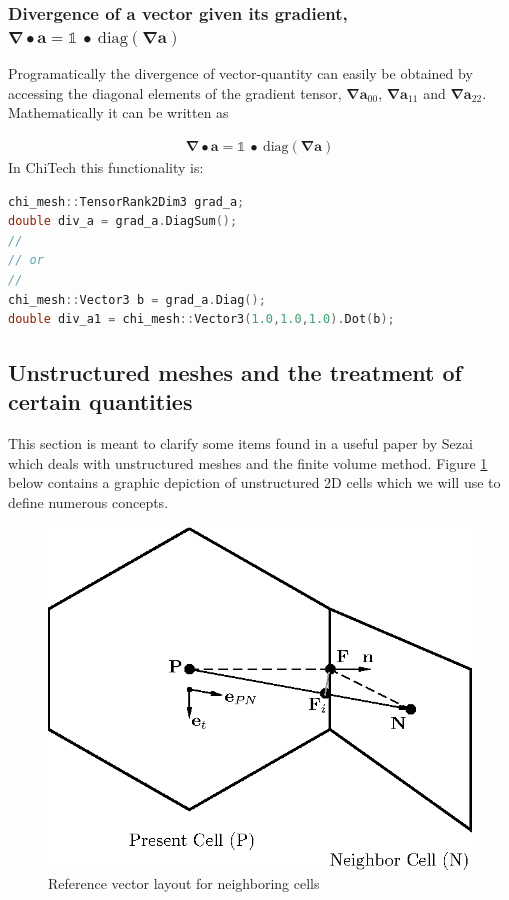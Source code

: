 \documentclass[11pt,letterpaper,titlepage]{article}
\newcommand{\beqn}{\begin{equation}
	\begin{aligned}}
\newcommand{\eeqn}{\end{aligned}
	\end{equation}}
\newcommand{\bnabla}{\boldsymbol{\nabla}}
\numberwithin{equation}{section}
\begin{document}
\subsubsection{Divergence of a vector given its gradient, $\bnabla \bullet \mathbf{a} = \mathbb{1} \ \bullet \ \text{diag}(\bnabla \mathbf{a})$}
Programatically the divergence of vector-quantity can easily be obtained by accessing the diagonal elements of the gradient tensor, $\bnabla \mathbf{a}_{00}$, $\bnabla \mathbf{a}_{11}$ and $\bnabla \mathbf{a}_{22}$. Mathematically it can be written as

\beqn 
\bnabla \bullet \mathbf{a} = \mathbb{1} \ \bullet \ \text{diag}(\bnabla \mathbf{a})
\eeqn 
\newline
\newline
In ChiTech this functionality is:
\begin{lstlisting}[language=c++]
chi_mesh::TensorRank2Dim3 grad_a;
double div_a = grad_a.DiagSum();
//
// or
//
chi_mesh::Vector3 b = grad_a.Diag();
double div_a1 = chi_mesh::Vector3(1.0,1.0,1.0).Dot(b);
\end{lstlisting}

\vspace{1cm}
\subsection{Unstructured meshes and the treatment of certain quantities}
This section is meant to clarify some items found in a useful paper by Sezai \cite{Sezai} which deals with unstructured meshes and the finite volume method. Figure \ref{fig:faceaverages} below contains a graphic depiction of unstructured 2D cells which we will use to define numerous concepts.

\begin{figure}[H]
\centering
\includegraphics[width=0.5\linewidth]{Figures/FaceAverages}
\caption{Reference vector layout for neighboring cells}
\label{fig:faceaverages}
\end{figure}
\end{document}
